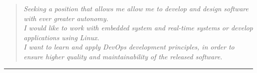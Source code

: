 \documentclass[english,10pt,a4paper]{article}
\begin{document}
\begin{paracol}{2}
	\begin{tcolorbox}[colback=CvSidebarBackColor,height=\textheight,boxrule=0pt, left=0pt,right=0pt,top=0pt,bottom=0pt, arc=0pt,outer arc=0pt]
		\centering
		
		\begin{quotation}
			\textcolor{CvSidebarTextColor}
			{\textsl{Seeking a position that allows me allow me to develop and design  software with ever greater autonomy.\\	
			I would like to work with embedded system and real-time systems or develop applications using Linux.\\
			I want to learn and apply DevOps development principles, in
			order to ensure higher quality and maintainability of the
			released software.
			}}
			
		\end{quotation}

		\textcolor{CvSidebarTextColor}{\rule[.5\baselineskip]{0.9\textwidth}{1.5pt}}


\end{tcolorbox}
\end{paracol}
\end{document}
